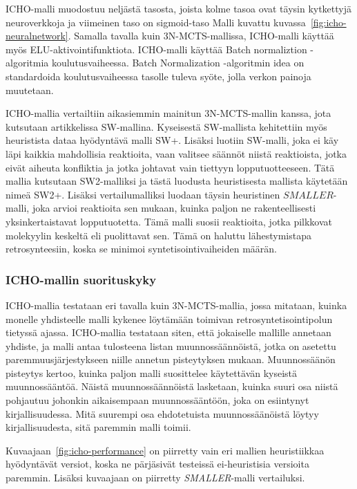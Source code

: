 \documentclass[finnish,twoside,censored,tkt,sw-line]{HYthesisML}
\begin{document}
ICHO-malli muodostuu neljästä tasosta, joista kolme tasoa ovat täysin kytkettyjä neuroverkkoja ja viimeinen taso on sigmoid-taso
Malli kuvattu kuvassa~\ref{fig:icho-neuralnetwork}.
Samalla tavalla kuin 3N-MCTS-mallissa, ICHO-malli käyttää myös ELU-aktivointifunktiota.
ICHO-malli käyttää Batch normaliztion -algoritmia koulutusvaiheessa.
Batch Normalization -algoritmin idea on standardoida koulutusvaiheessa tasolle tuleva syöte, jolla verkon painoja muutetaan.

ICHO-mallia vertailtiin aikasiemmin mainitun 3N-MCTS-mallin kanssa, jota kutsutaan artikkelissa SW-mallina.
Kyseisestä SW-mallista kehitettiin myös heuristista dataa hyödyntävä malli SW+.
Lisäksi luotiin SW-malli, joka ei käy läpi kaikkia mahdollisia reaktioita, vaan valitsee säännöt niistä reaktioista, jotka eivät aiheuta konfliktia ja jotka johtavat vain tiettyyn lopputuotteeseen.
Tätä mallia kutsutaan SW2-malliksi ja tästä luodusta heuristisesta mallista käytetään nimeä SW2+.
Lisäksi vertailumalliksi luodaan täysin heuristinen \(SMALLER\)-malli, joka arvioi reaktioita sen mukaan, kuinka paljon ne rakenteellisesti yksinkertaistavat lopputuotetta.
Tämä malli suosii reaktioita, jotka pilkkovat molekyylin keskeltä eli puolittavat sen.
Tämä on haluttu lähestymistapa retrosynteesiin, koska se minimoi syntetisointivaiheiden määrän.

\subsubsection{ICHO-mallin suorituskyky}

ICHO-mallia testataan eri tavalla kuin 3N-MCTS-mallia, jossa mitataan, kuinka monelle yhdisteelle malli kykenee löytämään toimivan retrosyntetisointipolun tietyssä ajassa.
ICHO-mallia testataan siten, että jokaiselle mallille annetaan yhdiste, ja malli antaa tulosteena listan muunnossäännöistä, jotka on asetettu paremmuusjärjestykseen niille annetun pisteytyksen mukaan.
Muunnossäänön pisteytys kertoo, kuinka paljon malli suosittelee käytettävän kyseistä muunnossääntöä.
Näistä muunnossäännöistä lasketaan, kuinka suuri osa niistä pohjautuu johonkin aikaisempaan muunnossääntöön, joka on esiintynyt kirjallisuudessa.
Mitä suurempi osa ehdotetuista muunnossäänöistä löytyy kirjallisuudesta, sitä paremmin malli toimii.

Kuvaajaan~\ref{fig:icho-performance} on piirretty vain eri mallien heuristiikkaa hyödyntävät versiot, koska ne pärjäsivät testeissä ei-heuristisia versioita paremmin.
Lisäksi kuvaajaan on piirretty \emph{SMALLER}-malli vertailuksi.
\end{document}
